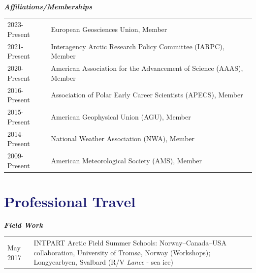 \documentclass[margin,line,palatino,courier,10pt]{res}
\begin{document}
\begin{resume}
\textit{\textbf{Affiliations/Memberships}}
\vspace*{0.05in}\\
\begin{tabular}{@{}p{0.9in}p{4in}}
2023-Present & European Geosciences Union, Member\\
2021-Present & Interagency Arctic Research Policy Committee (IARPC), Member\\
2020-Present & American Association for the Advancement of Science (AAAS), Member\\
2016-Present & Association of Polar Early Career Scientists (APECS), Member\\ 
2015-Present & American Geophysical Union (AGU), Member\\
2014-Present & National Weather Association (NWA), Member\\
2009-Present & American Meteorological Society (AMS), Member\\
\end{tabular}

\section{\sc \textcolor{MidnightBlue}{\large{\textbf{Professional Travel}}}}
\textit{\textbf{Field Work}}
\vspace*{0.05in}\\
\begin{tabular}{@{}p{0.9in}p{4in}}
May 2017 & INTPART Arctic Field Summer Schools: Norway--Canada--USA collaboration, University of Troms\o, Norway (Workshops); Longyearbyen, Svalbard (R/V \textit{Lance} - sea ice)
\end{tabular}


\end{resume}
\end{document}
